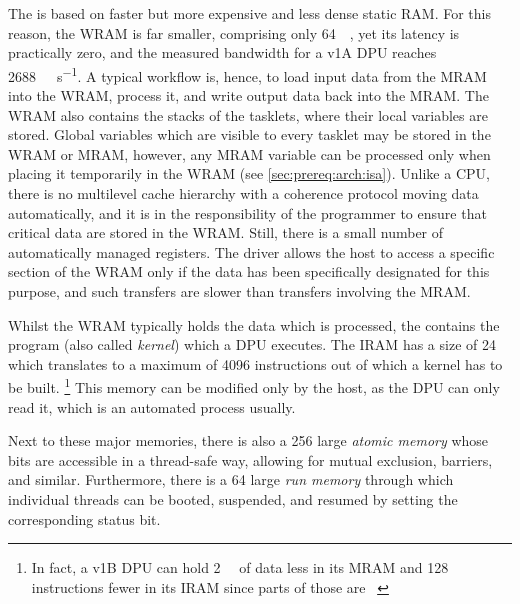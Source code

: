 The  is based on faster but more expensive and less dense static \ac{RAM}.
For this reason, the \ac{WRAM} is far smaller, comprising only \qty{64}{\kibi\byte}, yet its latency is practically zero, and the measured bandwidth for a v1A \ac{DPU} reaches \qty{2688}{\mebi\byte\per\second}.
A typical workflow is, hence, to load input data from the \ac{MRAM} into the \ac{WRAM}, process it, and write output data back into the \ac{MRAM}.
The \ac{WRAM} also contains the stacks of the tasklets, where their local variables are stored.
Global variables which are visible to every tasklet may be stored in the \ac{WRAM} or \ac{MRAM}, however, any \ac{MRAM} variable can be processed only when placing it temporarily in the \ac{WRAM} (see \cref{sec:prereq:arch:isa}).
Unlike a \ac{CPU}, there is no multilevel cache hierarchy with a coherence protocol moving data automatically, and it is in the responsibility of the programmer to ensure that critical data are stored in the \ac{WRAM}.
Still, there is a small number of automatically managed registers.
The driver allows the host to access a specific section of the \ac{WRAM} only if the data has been specifically designated for this purpose, and such transfers are slower than transfers involving the \ac{MRAM}.

Whilst the \ac{WRAM} typically holds the data which is processed, the  contains the program (also called \emph{kernel}) which a \ac{DPU} executes.
The \ac{IRAM} has a size of \qty{24}{\kibi\byte} which translates to a maximum of \num{4096} instructions out of which a kernel has to be built.%
\footnote{
	In fact, a v1B \ac{DPU} can hold \qty{2}{\kibi\byte} of data less in its \ac{MRAM} and 128 instructions fewer in its \ac{IRAM} since parts of those are ~\cite[Introduction~-- DPU chip characteristics]{upmemSDK}
}
This memory can be modified only by the host, as the \ac{DPU} can only read it, which is an automated process usually.

Next to these major memories, there is also a \qty{256}{\bit} large \emph{atomic memory} whose bits are accessible in a thread-safe way, allowing for mutual exclusion, barriers, and similar.
Furthermore, there is a \qty{64}{\bit} large \emph{run memory} through which individual threads can be booted, suspended, and resumed by setting the corresponding status bit.
